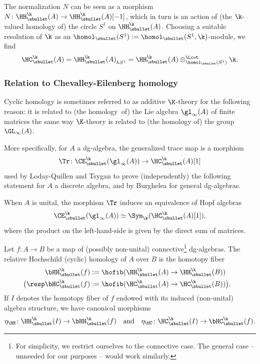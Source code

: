 \begin{rmq}\label{rmq:HChS}
The normalization $N$ can be seen as a morphism $N \colon \HH_\sbullet^\k(A) \to \HH_\sbullet^\k(A)[-1]$, which in turn is an action of (the $\k$-valued homology of) the circle $S^1$ on $\HH_\sbullet^\k(A)$.
Choosing a suitable resolution of $\k$ as an $\homol_\sbullet(S^1) := \homol_\sbullet(S^1,\k)$-module, we find
\[
\HC_\sbullet^\k(A) = {\HH_\sbullet^\k(A)}_{hS^1} = \HH_\sbullet^\k(A) \otimes^\Lcot_{\homol_\sbullet(S^1)} \k.
\]
\end{rmq}

\subsubsection{Relation to Chevalley-Eilenberg homology}\label{par:tracemap}

Cyclic homology is sometimes refer\-red to as additive $\K$-theory for the following reason: it is related to (the homology~of) the Lie algebra $\gl_\infty(A)$ of finite matrices the same way $\K$-theory is related to (the homology of) the group $\GL_\infty(A)$.

More specifically, for $A$ a dg-algebra, the generalized trace map is a morphism
\[
\Tr \colon \CE^\k_\sbullet(\gl_\infty(A)) \to \HC_\sbullet^\k(A) [1]
\]
used by Loday-Quillen \cite{lodayquillen} and Tsygan \cite{tsygan:HC} to prove (independently) the following statement for $A$ a discrete algebra, and by Burghelea \cite{burghelea:cyclicK} for general dg\nobreakdash-alge\-bras.
\begin{thm}\label{thm:LQT}
When $A$ is unital, the morphism $\Tr$ induces an equivalence of Hopf algebras
\[
\CE^\k_\sbullet(\gl_\infty(A)) \simeq \Sym_\k(\HC_\sbullet^\k(A)[1]),
\]
where the product on the left-hand-side is given by the direct sum of matrices.
\end{thm}

\label{subsec:wodzicki}

\begin{df}
Let $f \colon A \to B$ be a map of (possibly non-unital) connective\footnote{For simplicity, we restrict ourselves to the connective case. The general case -- unneeded for our purposes -- would work similarly.} dg-algebras.
The relative Hochschild (\resp cyclic) homology of $A$ over $B$ is the homo\-topy fiber
\begin{align*}
\bHH_\sbullet^\k(f) &:= \hofib( \HH_\sbullet^\k(A) \to \HH_\sbullet^\k(B)) \hspace{1.5em} \\ \bigl(\resp \bHC_\sbullet^\k(f) &:= \hofib(\HC_\sbullet^\k(A) \to \HC_\sbullet^\k(B)) \bigr).
\end{align*}
If $I$ denotes the homotopy fiber of $f$ endowed with its induced (non-unital) algebra structure, we have canonical morphisms
\[
\eta_\HH \colon \HH_\sbullet^\k(I) \to \bHH_\sbullet^\k(f) \quad\text{and} \quad \eta_\HC \colon \HC_\sbullet^\k(I) \to \bHC_\sbullet^\k(f).
\]

\end{df}

